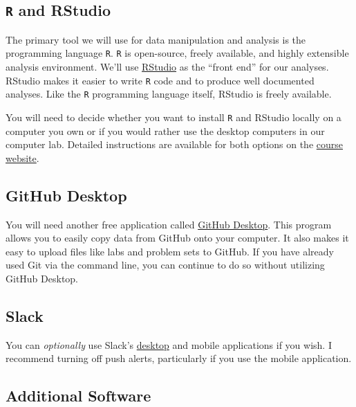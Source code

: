 \documentclass[
]{book}
\begin{document}
\hypertarget{r-and-rstudio}{%
\subsection{\texorpdfstring{\texttt{R} and RStudio}{R and RStudio}}\label{r-and-rstudio}}

The primary tool we will use for data manipulation and analysis is the programming language \texttt{R}. \texttt{R} is open-source, freely available, and highly extensible analysis environment. We'll use \href{https://www.rstudio.com}{RStudio} as the ``front end'' for our analyses. RStudio makes it easier to write \texttt{R} code and to produce well documented analyses. Like the \texttt{R} programming language itself, RStudio is freely available.

You will need to decide whether you want to install \texttt{R} and RStudio locally on a computer you own or if you would rather use the desktop computers in our computer lab. Detailed instructions are available for both options on the \href{https://slu-soc5650.github.io/docs/course-software/}{course website}.

\hypertarget{github-desktop}{%
\subsection{GitHub Desktop}\label{github-desktop}}

You will need another free application called \href{https://desktop.github.com}{GitHub Desktop}. This program allows you to easily copy data from GitHub onto your computer. It also makes it easy to upload files like labs and problem sets to GitHub. If you have already used Git via the command line, you can continue to do so without utilizing GitHub Desktop.

\hypertarget{slack-1}{%
\subsection{Slack}\label{slack-1}}

You can \emph{optionally} use Slack's \href{https://slack.com/downloads}{desktop} and mobile applications if you wish. I recommend turning off push alerts, particularly if you use the mobile application.

\hypertarget{additional-software}{%
\subsection{Additional Software}\label{additional-software}}
\end{document}
